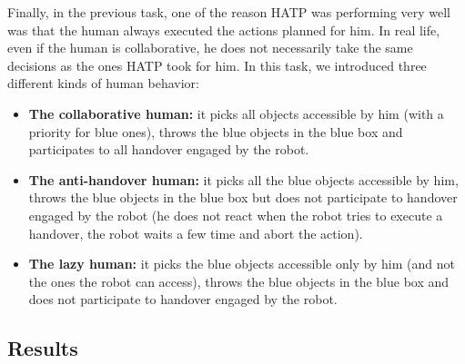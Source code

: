 \documentclass[english,a4paper,11pt,twoside]{StyleThese}
\begin{document}
Finally, in the previous task, one of the reason HATP was performing very well was that the human always executed the actions planned for him. In real life, even if the human is collaborative, he does not necessarily take the same decisions as the ones HATP took for him. In this task, we introduced three different kinds of human behavior:
\begin{itemize}
\item \textbf{The collaborative human:} it picks all objects accessible by him (with a priority for blue ones), throws the blue objects in the blue box and participates to all handover engaged by the robot.
\item \textbf{The anti-handover human:} it picks all the blue objects accessible by him, throws the blue objects in the blue box but does not participate to handover engaged by the robot (he does not react when the robot tries to execute a handover, the robot waits a few time and abort the action).
\item \textbf{The lazy human:} it picks the blue objects accessible only by him (and not the ones the robot can access), throws the blue objects in the blue box and does not participate to handover engaged by the robot.
\end{itemize}

\subsection{Results}
\end{document}
